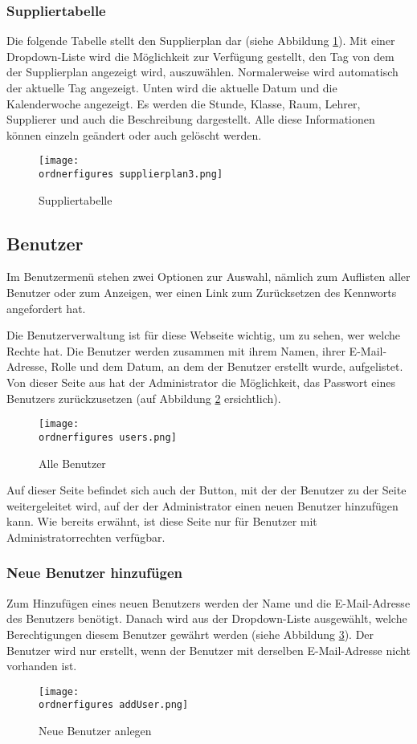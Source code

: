 \subsubsection{Suppliertabelle}
Die folgende Tabelle stellt den Supplierplan dar (siehe Abbildung \ref{fi:Suppliertabelle}). Mit einer Dropdown-Liste wird die Möglichkeit zur Verfügung gestellt, den Tag von dem der Supplierplan angezeigt wird, auszuwählen. Normalerweise wird automatisch der aktuelle Tag angezeigt. Unten wird die aktuelle Datum und die Kalenderwoche angezeigt. Es werden die Stunde, Klasse, Raum, Lehrer, Supplierer und auch die Beschreibung dargestellt. Alle diese Informationen können einzeln geändert oder auch gelöscht werden.

\begin{figure}[H]
	\centering
	\texttt{[image: \\ordnerfigures supplierplan3.png]}
	\caption{Suppliertabelle}
	\label{fi:Suppliertabelle}
\end{figure} 
\subsection{Benutzer}
Im Benutzermenü stehen zwei Optionen zur Auswahl, nämlich zum Auflisten aller Benutzer oder zum Anzeigen, wer einen Link zum Zurücksetzen des Kennworts angefordert hat. 

Die Benutzerverwaltung ist für diese Webseite wichtig, um zu sehen, wer welche Rechte hat. Die Benutzer werden zusammen mit ihrem Namen, ihrer E-Mail-Adresse, Rolle und dem Datum, an dem der Benutzer erstellt wurde, aufgelistet. Von dieser Seite aus hat der Administrator die Möglichkeit, das Passwort eines Benutzers zurückzusetzen (auf Abbildung \ref*{fi:users} ersichtlich).

\begin{figure}[H]
	\centering
	\texttt{[image: \\ordnerfigures users.png]}
	\caption{Alle Benutzer}
	\label{fi:users}
\end{figure}

Auf dieser Seite befindet sich auch der Button, mit der der Benutzer zu der Seite weitergeleitet wird, auf der der Administrator einen neuen Benutzer hinzufügen kann. Wie bereits erwähnt, ist diese Seite nur für Benutzer mit Administratorrechten verfügbar.



\subsubsection{Neue Benutzer hinzufügen}
Zum Hinzufügen eines neuen Benutzers werden der Name und die E-Mail-Adresse des Benutzers benötigt. Danach wird aus der Dropdown-Liste ausgewählt, welche Berechtigungen diesem Benutzer gewährt werden (siehe Abbildung \ref{fi:addUser}). Der Benutzer wird nur erstellt, wenn der Benutzer mit derselben E-Mail-Adresse nicht vorhanden ist. 
\begin{figure}[h]
	\centering
	\texttt{[image: \\ordnerfigures addUser.png]}
	\caption{Neue Benutzer anlegen}
	\label{fi:addUser}
\end{figure}


